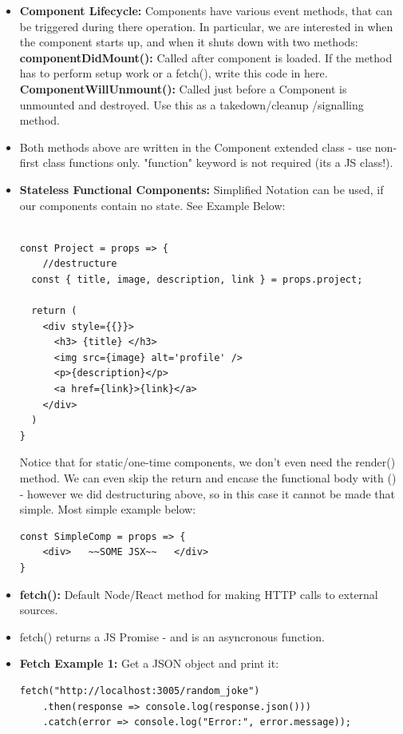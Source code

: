 \documentclass[8pt,a4paper]{extarticle}
\begin{document}
\begin{itemize}
\item \textbf{Component Lifecycle:} Components have various event methods, that can be triggered during there operation. In particular, we are interested in when the component starts up, and when it shuts down with two methods:
\mitem \textbf{componentDidMount():} Called after component is loaded. If the method has to perform setup work or a fetch(), write this code in here.
\mitem \textbf{ComponentWillUnmount():} Called just before a Component is unmounted and destroyed. Use this as a takedown/cleanup
/signalling method.
\item Both methods above are written in the Component extended class - use non-first class functions only. "function" keyword is not required (its a JS class!).
\item \textbf{Stateless Functional Components:} Simplified Notation can be used, if our components contain no state. See Example Below:

\begin{verbatim}

const Project = props => {
	//destructure
  const { title, image, description, link } = props.project;
 
  return (
    <div style={{}}>
      <h3> {title} </h3>
      <img src={image} alt='profile' />
      <p>{description}</p>
      <a href={link}>{link}</a>
    </div>
  )
}
\end{verbatim}

Notice that for static/one-time components, we don't even need the render() method. We can even skip the return and encase the functional body with () - however we did destructuring above, so in this case it cannot be made that simple. Most simple example below:

\begin{verbatim}
const SimpleComp = props => {
	<div>   ~~SOME JSX~~   </div>
}
\end{verbatim}


\item \textbf{fetch():} Default Node/React method for making HTTP calls to external sources.
\item fetch() returns a JS Promise - and is an asyncronous function.
\item \textbf{Fetch Example 1:} Get a JSON object and print it:

\begin{verbatim}
fetch("http://localhost:3005/random_joke")
    .then(response => console.log(response.json()))
    .catch(error => console.log("Error:", error.message));
\end{verbatim}


\end{itemize}
\end{document}
